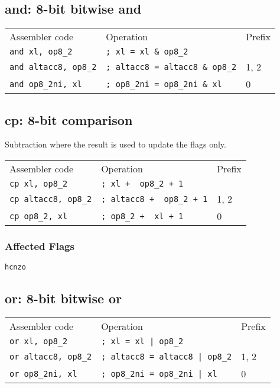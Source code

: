\documentclass{book}
\begin{document}
\subsection{and: 8-bit bitwise and}

\begin{tabular}{l l l}
Assembler code               & Operation                              & Prefix \\
\texttt{and xl, op8\_2}      & \texttt{; xl = xl \& op8\_2}           & \\
\texttt{and altacc8, op8\_2} & \texttt{; altacc8 = altacc8 \& op8\_2} & 1, 2 \\
\texttt{and op8\_2ni, xl}    & \texttt{; op8\_2ni = op8\_2ni \& xl}   & 0
\end{tabular}


\subsection{cp: 8-bit comparison}

Subtraction where the result is used to update the flags only.

\begin{tabular}{l l l}
Assembler code              & Operation                        & Prefix \\
\texttt{cp xl, op8\_2}      & \texttt{; xl + ~op8\_2 + 1}      & \\
\texttt{cp altacc8, op8\_2} & \texttt{; altacc8 + ~op8\_2 + 1} & 1, 2 \\
\texttt{cp op8\_2, xl}      & \texttt{; op8\_2 + ~xl + 1}      & 0
\end{tabular}

\subsubsection*{Affected Flags}

\texttt{hcnzo}


\subsection{or: 8-bit bitwise or}

\begin{tabular}{l l l}
Assembler code              & Operation                             & Prefix \\
\texttt{or xl, op8\_2}      & \texttt{; xl = xl | op8\_2}           & \\
\texttt{or altacc8, op8\_2} & \texttt{; altacc8 = altacc8 | op8\_2} & 1, 2 \\
\texttt{or op8\_2ni, xl}    & \texttt{; op8\_2ni = op8\_2ni | xl}   & 0
\end{tabular}
\end{document}
